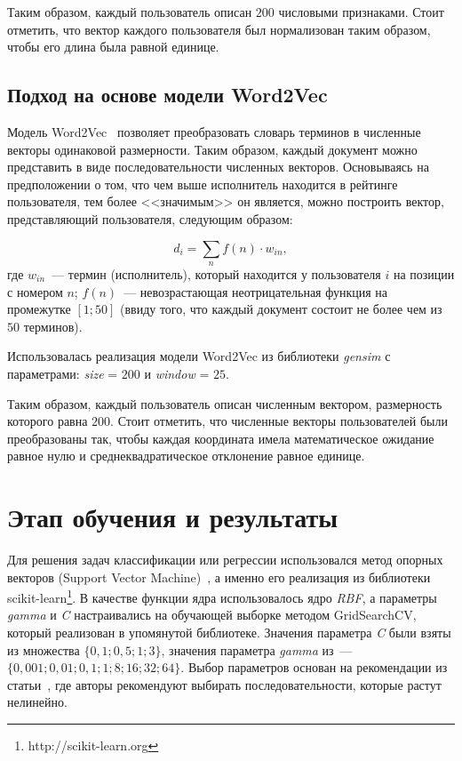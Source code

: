 \documentclass{spisok-article}
\begin{document}
Таким образом, каждый пользователь описан $200$ числовыми признаками. 
Стоит отметить, что вектор каждого пользователя был 
нормализован таким образом, чтобы его длина была равной единице.

\subsection{Подход на основе модели Word2Vec}
Модель Word2Vec~\cite{word2vec} позволяет преобразовать словарь
терминов в численные векторы одинаковой размерности. Таким
образом, каждый документ можно представить в виде
последовательности численных векторов. Основываясь на
предположении о том, что чем выше исполнитель находится в
рейтинге пользователя, тем более <<значимым>> он является,
можно построить вектор, представляющий пользователя, следующим
образом:

\begin{equation} \label{eq:doc2vec}
    d_{i} = \sum_{n}{f(n) \cdot w_{in}},
\end{equation}
где $w_{in}$~--- термин (исполнитель), который находится
у пользователя $i$ на позиции с номером $n$; $f(n)$~---
невозрастающая неотрицательная функция на промежутке $[1; 50]$
(ввиду того, что каждый документ состоит 
не более чем из $50$ терминов).

Использовалась реализация модели Word2Vec из 
библиотеки \textit{gensim} с параметрами:
\textit{size} = $200$ и \textit{window} = $25$.

Таким образом, каждый пользователь описан численным вектором,
размерность которого равна $200$. Стоит отметить, что численные
векторы пользователей были преобразованы так, чтобы
каждая координата имела математическое ожидание равное нулю и
среднеквадратическое отклонение равное единице.


\section{Этап обучения и результаты}

Для решения задач классификации или регрессии использовался
метод опорных векторов (Support Vector Machine)~\cite{svm},
а именно его реализация
из библиотеки scikit-learn\footnote{http://scikit-learn.org}.
В качестве функции ядра использовалось ядро \textit{RBF}, а параметры
\textit{gamma} и \textit{C} настраивались на обучающей выборке
методом GridSearchCV, который реализован в упомянутой библиотеке.
Значения параметра \textit{C} были взяты из множества
$\{0{,}1; 0{,}5; 1; 3\}$, значения параметра \textit{gamma} из~--- 
$\{0{,}001; 0{,}01; 0{,}1; 1; 8; 16; 32; 64\}$. Выбор параметров
основан на рекомендации из статьи~\cite{svm2003recom}, где
авторы рекомендуют выбирать последовательности, которые растут нелинейно.
\end{document}
